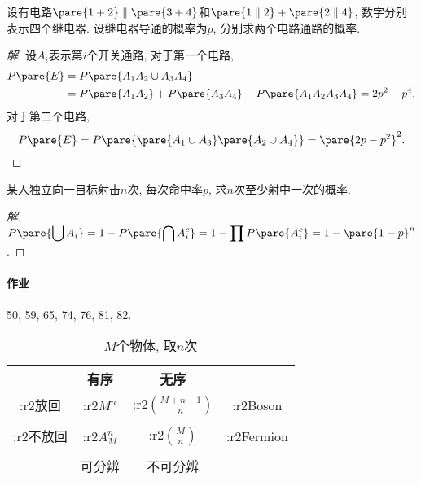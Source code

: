 \documentclass{ctexart}
\begin{document}
\begin{sample}
    \begin{ex}
        设有电路$\pare{1+2}\parallel\pare{3+4}$和$\pare{1\parallel 2} + \pare{2\parallel 4}$, 数字分别表示四个继电器. 设继电器导通的概率为$p$, 分别求两个电路通路的概率.
    \end{ex}
    \begin{proof}[解]
        设$A_i$表示第$i$个开关通路, 对于第一个电路,
        \begin{align*}
            P\pare{E} &= P\pare{A_1A_2 \cup A_3A_4} \\&= P\pare{A_1A_2} + P\pare{A_3A_4} - P\pare{A_1A_2A_3A_4} = 2p^2 -p^4. 
        \end{align*}
        对于第二个电路,
        \[ P\pare{E} = P\pare{\pare{A_1\cup A_3}\pare{A_2\cup A_4}} = \pare{2p-p^2}^2. \qedhere \]
    \end{proof}
\end{sample}
\begin{sample}
    \begin{ex}
        某人独立向一目标射击$n$次, 每次命中率$p$, 求$n$次至少射中一次的概率.
    \end{ex}
    \begin{proof}[解]
        $\displaystyle P\pare{\bigcup A_i} = 1 - P\pare{\bigcap A_i^c} = 1 - \prod P\pare{A_i^c} = 1 - \pare{1-p}^n$.
    \end{proof}
\end{sample}
\centerline{
}
\paragraph{作业} %
\label{par:作业}

50, 59, 65, 74, 76, 81, 82.


\begin{table}[h]
    \centering
    \begin{tabular}{|c|c|c|c|}
        \hline
        & 有序 & 无序 & \\
        \hline
        \+:r2{放回} & \+:r2{$\displaystyle M^n$} & \+:r2{$\displaystyle \binom{M+n-1}{n}$} & \+:r2{Boson}\\
        &&& \\
        \hline
        \+:r2{不放回} & \+:r2{$\displaystyle A_M^n$} & \+:r2{$\displaystyle \binom{M}{n}$} & \+:r2{Fermion} \\
        &&& \\
        \hline
        &可分辨&不可分辨 & \\ 
        \hline
    \end{tabular}
    \caption{$M$个物体, 取$n$次}
\end{table}


\end{document}
